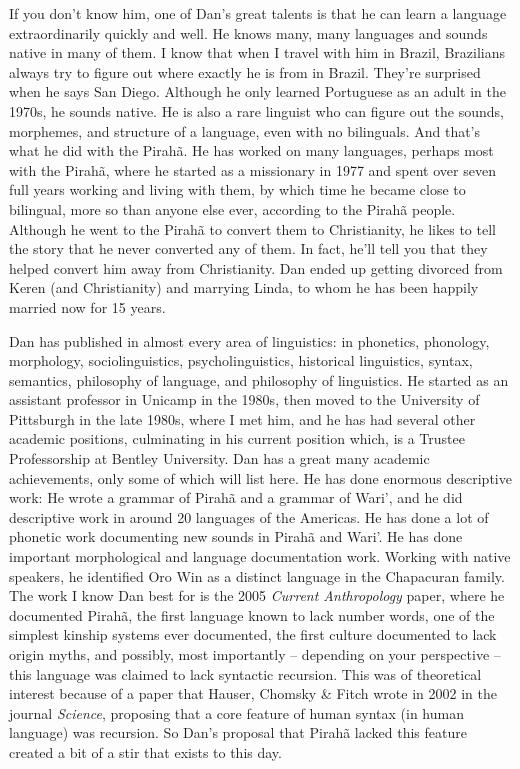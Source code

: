 \begin{refsection}
If you don't know him, one of Dan's great talents is that he can learn a language extraordinarily quickly and well. He knows many, many languages and sounds native in many of them. I know that when I travel with him in Brazil, Brazilians always try to figure out where exactly he is from in Brazil. They're surprised when he says San Diego. Although he only learned Portuguese as an adult in the 1970s, he sounds native. He is also a rare linguist who can figure out the sounds, morphemes, and structure of a language, even with no bilinguals. And that's what he did with the Pirahã. He has worked on many languages, perhaps most with the Pirahã, where he started as a missionary in 1977 and spent over seven full years working and living with them, by which time he became close to bilingual, more so than anyone else ever, according to the Pirahã people. Although he went to the Pirahã to convert them to Christianity, he likes to tell the story that he never converted any of them. In fact, he'll tell you that they helped convert him away from Christianity. Dan ended up getting divorced from Keren (and Christianity) and marrying Linda, to whom he has been happily married now for 15 years. 

Dan has published in almost every area of linguistics: in phonetics, phonology, morphology, sociolinguistics, psycholinguistics, historical linguistics, syntax, semantics, philosophy of language, and philosophy of linguistics. He started as an assistant professor in Unicamp in the 1980s, then moved to the University of Pittsburgh in the late 1980s, where I met him, and he has had several other academic positions, culminating in his current position which, is a Trustee Professorship at  Bentley University. Dan has a great many academic achievements, only some of which will list here. He has done enormous descriptive work: He wrote  a grammar of Pirahã and a grammar of Wari', and he did descriptive work in around 20 languages of the Americas. He has done a lot of phonetic work documenting new sounds in Pirahã and Wari'. He has done important morphological and language documentation work. Working with native speakers, he identified Oro Win as a distinct language in the Chapacuran family. The work I know Dan best for is the 2005 \textit{Current Anthropology} paper, where he documented Pirahã, the first language known to lack number words, one of the simplest kinship systems ever documented, the first culture documented to lack origin myths, and possibly, most importantly -- depending on your perspective -- this language was claimed to lack syntactic recursion. This was of theoretical interest because of a paper that Hauser, Chomsky \& Fitch wrote in 2002 in the journal \textit{Science}, proposing that a core feature of human syntax (in human language) was recursion. So Dan's proposal that Pirahã lacked this feature created a bit of a stir that exists to this day.


\end{refsection}
